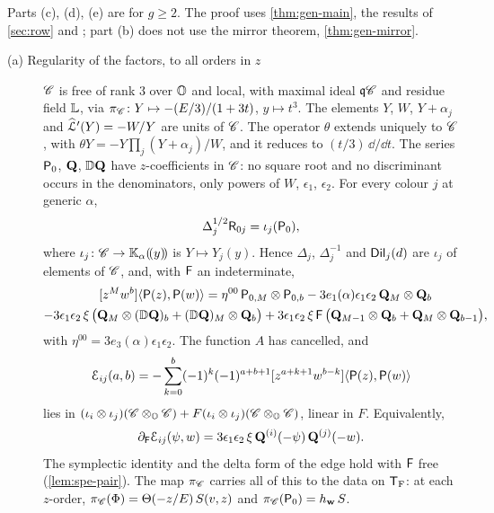 \begin{thm}[Specialisation]
\label{thm:spe-main}
Parts (c), (d), (e) are for $g\geq 2$. The proof uses \cref{thm:gen-main}, the results of \cref{sec:row} and \cite{GP99}; part \textup{(b)} does not use the mirror theorem, \cref{thm:gen-mirror}.
\begin{description}
\item[(a) Regularity of the factors, to all orders in $z$] $\mathscr{C}$ is free of rank $3$ over $\mathbb{O}$ and local, with maximal ideal $\mathfrak{q}\mathscr{C}$ and residue field $\mathbb{L}$, via $\pi_{\mathscr{C}}\colon Y\mapsto-(E/3)/(1+3t)$, $y\mapsto t^3$. The elements $Y$, $W$, $Y+\alpha_j$ and $\widehat{\mathcal{L}}'(Y)=-W/Y$ are units of $\mathscr{C}$. The operator $\theta$ extends uniquely to $\mathscr{C}$, with $\theta Y=-Y\prod_j(Y+\alpha_j)/W$, and it reduces to $(t/3)\,\dd/\dd t$. The series $\mathsf{P}_0$, $\mathbf{Q}$, $\mathbb{D}\mathbf{Q}$ have $z$-coefficients in $\mathscr{C}$: no square root and no discriminant occurs in the denominators, only powers of $W$, $\epsilon_1$, $\epsilon_2$. For every colour $j$ at generic $\alpha$,
\[
\Delta_j^{1/2}\mathsf{R}_{0j}=\iota_j(\mathsf{P}_0),
\]
where $\iota_j\colon\mathscr{C}\to\mathbb{K}_{\alpha}(\!(y)\!)$ is $Y\mapsto Y_j(y)$. Hence $\Delta_j$, $\Delta_j^{-1}$ and $\mathsf{Dil}_j(d)$ are $\iota_j$ of elements of $\mathscr{C}$, and, with $\mathsf{F}$ an indeterminate,
\begin{multline}
\label{eq:spe-pair}
[z^Mw^b]\langle\mathsf{P}(z),\mathsf{P}(w)\rangle
=\eta^{00}\,\mathsf{P}_{0,M}\otimes\mathsf{P}_{0,b}-3e_1(\alpha)\epsilon_1\epsilon_2\,\mathbf{Q}_M\otimes\mathbf{Q}_b\\
-3\epsilon_1\epsilon_2\,\xi\,\big(\mathbf{Q}_M\otimes(\mathbb{D}\mathbf{Q})_b+(\mathbb{D}\mathbf{Q})_M\otimes\mathbf{Q}_b\big)
+3\epsilon_1\epsilon_2\,\xi\,\mathsf{F}\,\big(\mathbf{Q}_{M-1}\otimes\mathbf{Q}_b+\mathbf{Q}_M\otimes\mathbf{Q}_{b-1}\big),
\end{multline}
with $\eta^{00}=3e_3(\alpha)\epsilon_1\epsilon_2$. The function $A$ has cancelled, and
\[
\mathcal{E}_{ij}(a,b)=-\sum_{k=0}^{b}(-1)^k(-1)^{a+b+1}[z^{a+k+1}w^{b-k}]\langle\mathsf{P}(z),\mathsf{P}(w)\rangle
\]
lies in $(\iota_i\otimes\iota_j)(\mathscr{C}\otimes_{\mathbb{O}}\mathscr{C})+F(\iota_i\otimes\iota_j)(\mathscr{C}\otimes_{\mathbb{O}}\mathscr{C})$, linear in $F$. Equivalently,
\[
\partial_{\mathsf{F}}\mathcal{E}_{ij}(\psi,w)=3\epsilon_1\epsilon_2\,\xi\,\mathbf{Q}^{(i)}(-\psi)\,\mathbf{Q}^{(j)}(-w).
\]
The symplectic identity and the delta form of the edge hold with $\mathsf{F}$ free (\cref{lem:spe-pair}). The map $\pi_{\mathscr{C}}$ carries all of this to the data on $\mathsf{T}_{\mathrm{F}}$: at each $z$-order, $\pi_{\mathscr{C}}(\Phi)=\Theta(-z/E)\,S(v,z)$ and $\pi_{\mathscr{C}}(\mathsf{P}_0)=h_{\mathbf{w}}\,S$.


\end{description}
\end{thm}
